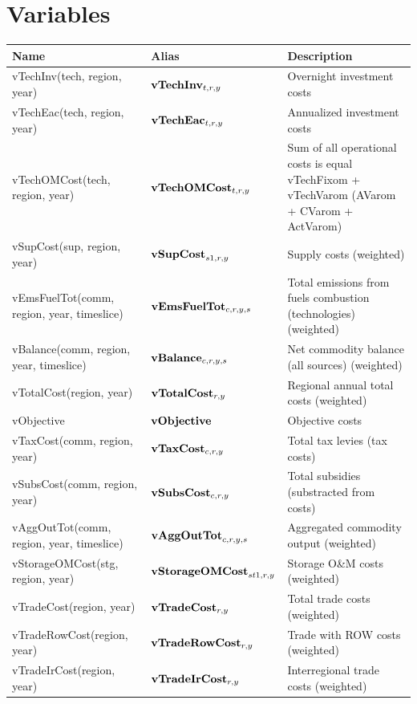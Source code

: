 \documentclass{article}
\begin{document}
\section*{Variables}
\begin{longtable}{|p{10cm}|p{5cm}|p{9cm}|}
\hline
\bf{Name} & \bf{Alias}   & \bf{Description} \\
 \hline
vTechInv(tech, region, year) & ${\bf vTechInv}_{t,r,y}$ & Overnight investment costs \\
 \hline
vTechEac(tech, region, year) & ${\bf vTechEac}_{t,r,y}$ & Annualized investment costs \\
 \hline
vTechOMCost(tech, region, year) & ${\bf vTechOMCost}_{t,r,y}$ & Sum of all operational costs is equal vTechFixom + vTechVarom (AVarom + CVarom + ActVarom) \\
 \hline
vSupCost(sup, region, year) & ${\bf vSupCost}_{s1,r,y}$ & Supply costs (weighted) \\
 \hline
vEmsFuelTot(comm, region, year, timeslice) & ${\bf vEmsFuelTot}_{c,r,y,s}$ & Total emissions from fuels combustion (technologies) (weighted) \\
 \hline
vBalance(comm, region, year, timeslice) & ${\bf vBalance}_{c,r,y,s}$ & Net commodity balance (all sources) (weighted) \\
 \hline
vTotalCost(region, year) & ${\bf vTotalCost}_{r,y}$ & Regional annual total costs (weighted) \\
 \hline
vObjective & ${\bf vObjective}$ & Objective costs \\
 \hline
vTaxCost(comm, region, year) & ${\bf vTaxCost}_{c,r,y}$ & Total tax levies (tax costs) \\
 \hline
vSubsCost(comm, region, year) & ${\bf vSubsCost}_{c,r,y}$ & Total subsidies (substracted from costs) \\
 \hline
vAggOutTot(comm, region, year, timeslice) & ${\bf vAggOutTot}_{c,r,y,s}$ & Aggregated commodity output (weighted) \\
 \hline
vStorageOMCost(stg, region, year) & ${\bf vStorageOMCost}_{st1,r,y}$ & Storage O\&M costs (weighted) \\
 \hline
vTradeCost(region, year) & ${\bf vTradeCost}_{r,y}$ & Total trade costs (weighted) \\
 \hline
vTradeRowCost(region, year) & ${\bf vTradeRowCost}_{r,y}$ & Trade with ROW costs (weighted) \\
 \hline
vTradeIrCost(region, year) & ${\bf vTradeIrCost}_{r,y}$ & Interregional trade costs (weighted) \\
 \hline
\end{longtable}
\end{document}
